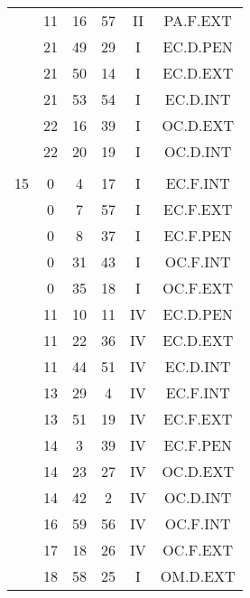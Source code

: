 \documentclass[12pt, a4paper]{article}
\begin{document}
\begin{multicols}{3}
{\begin{tabular}{c c c c c c}
	 	 	 	 & 11 & 16 & 57 & II & PA.F.EXT\\%
	 	 	 	 & 21 & 49 & 29 & I & EC.D.PEN\\%
	 	 	 	 & 21 & 50 & 14 & I & EC.D.EXT\\%
	 	 	 	 & 21 & 53 & 54 & I & EC.D.INT\\%
	 	 	 	 & 22 & 16 & 39 & I & OC.D.EXT\\%
	 	 	 	 & 22 & 20 & 19 & I & OC.D.INT\\%
	 	 	 	 & & & & & \\%
	 	 	 	15 & 0 & 4 & 17 & I & EC.F.INT\\%
	 	 	 	 & 0 & 7 & 57 & I & EC.F.EXT\\%
	 	 	 	 & 0 & 8 & 37 & I & EC.F.PEN\\%
	 	 	 	 & 0 & 31 & 43 & I & OC.F.INT\\%
	 	 	 	 & 0 & 35 & 18 & I & OC.F.EXT\\%
	 	 	 	 & 11 & 10 & 11 & IV & EC.D.PEN\\%
	 	 	 	 & 11 & 22 & 36 & IV & EC.D.EXT\\%
	 	 	 	 & 11 & 44 & 51 & IV & EC.D.INT\\%
	 	 	 	 & 13 & 29 & 4 & IV & EC.F.INT\\%
	 	 	 	 & 13 & 51 & 19 & IV & EC.F.EXT\\%
	 	 	 	 & 14 & 3 & 39 & IV & EC.F.PEN\\%
	 	 	 	 & 14 & 23 & 27 & IV & OC.D.EXT\\%
	 	 	 	 & 14 & 42 & 2 & IV & OC.D.INT\\%
	 	 	 	 & 16 & 59 & 56 & IV & OC.F.INT\\%
	 	 	 	 & 17 & 18 & 26 & IV & OC.F.EXT\\%
	 	 	 	 & 18 & 58 & 25 & I & OM.D.EXT\\%

\end{tabular}}
\end{multicols}
\end{document}
